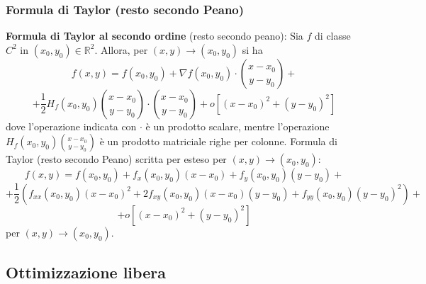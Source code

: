 \subsubsection{Formula di Taylor (resto secondo Peano)}
\textbf{Formula di Taylor al secondo ordine} (resto secondo peano):\newline
Sia $f$ di classe $C^2$ in $(x_0,y_0) \in \mathbb{R}^2$. Allora, per $(x,y) \rightarrow  (x_0, y_0)$ si ha 
\[
    f(x,y) = f(x_0,y_0) + \nabla f(x_0,y_0) \cdot \binom{x-x_0}{y-y_0} + 
\]
\[
    +\frac{1}{2} H_f(x_0,y_0) \binom{x-x_0}{y-y_0} \cdot \binom{x-x_0}{y-y_0} + o[(x-x_0)^2 + (y-y_0)^2]
\]
dove l'operazione indicata con $\cdot $ è un prodotto scalare, mentre l'operazione $H_f(x_0,y_0) \binom{x-x_0}{y-y_0}$ è un prodotto matriciale righe per colonne.
\newline
\newline
Formula di Taylor (resto secondo Peano) scritta per esteso per $(x,y) \rightarrow  (x_0,y_0)$:
\[
    f(x,y) = f(x_0, y_0) + f_x(x_0,y_0)(x-x_0) + f_y(x_0,y_0)(y-y_0) +
\]
\[
    + \frac{1}{2}\left( f_{xx}(x_0,y_0)(x-x_0)^2 + 2f_{xy}(x_0,y_0)(x-x_0)(y-y_0) + f_{yy}(x_0,y_0)(y-y_0)^2 \right) +
\]
\[
    + o[(x-x_0)^2 + (y-y_0)^2]
\]
per $(x,y) \rightarrow (x_0,y_0)$.
\subsection{Ottimizzazione libera}
